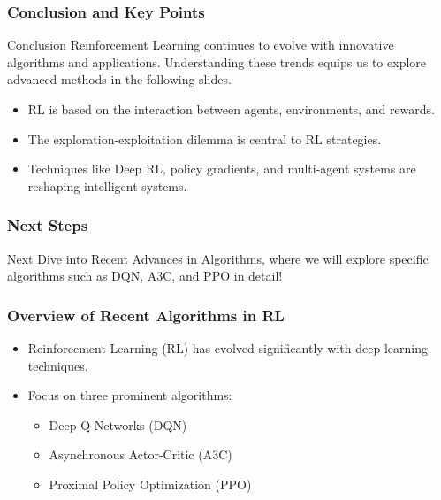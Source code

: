 \documentclass{beamer}
\begin{document}
\begin{frame}[fragile]
    \frametitle{Conclusion and Key Points}
    \begin{block}{Conclusion}
        Reinforcement Learning continues to evolve with innovative algorithms and applications. Understanding these trends equips us to explore advanced methods in the following slides.
    \end{block}

    \begin{itemize}
        \item RL is based on the interaction between agents, environments, and rewards.
        \item The exploration-exploitation dilemma is central to RL strategies.
        \item Techniques like Deep RL, policy gradients, and multi-agent systems are reshaping intelligent systems.
    \end{itemize}
\end{frame}

\begin{frame}[fragile]
    \frametitle{Next Steps}
    \begin{block}{Next}
        Dive into Recent Advances in Algorithms, where we will explore specific algorithms such as DQN, A3C, and PPO in detail!
    \end{block}
\end{frame}

\begin{frame}[fragile]
    \frametitle{Overview of Recent Algorithms in RL}
    \begin{itemize}
        \item Reinforcement Learning (RL) has evolved significantly with deep learning techniques.
        \item Focus on three prominent algorithms:
        \begin{itemize}
            \item Deep Q-Networks (DQN)
            \item Asynchronous Actor-Critic (A3C)
            \item Proximal Policy Optimization (PPO)
        \end{itemize}
    \end{itemize}
\end{frame}
\end{document}
